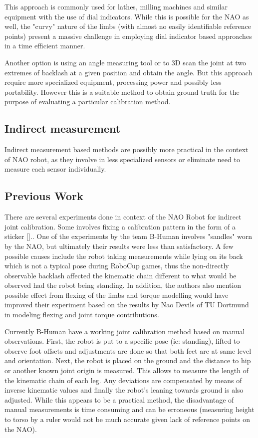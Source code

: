\documentclass[english, printversion, nomenclature, notitle]{tuvisionthesis} %
\begin{document}
This approach is commonly used for lathes, milling machines and similar equipment with the use of dial indicators. While this is possible for the NAO as well, the "curvy" nature of the limbs (with almost no easily identifiable reference points) present a massive challenge in employing dial indicator based approaches in a time efficient manner.

Another option is using an angle measuring tool or to 3D scan the joint at  two extremes of backlash at a given position and obtain the angle. But this approach require more specialized equipment, processing power and possibly less portability. However this is a suitable method to obtain ground truth for the purpose of evaluating a particular calibration method. 

\subsection{Indirect measurement}
Indirect measurement based methods are possibly more practical in the context of NAO robot, as they involve in less specialized sensors or eliminate need to measure each sensor individually.

\subsection{Previous Work}

There are several experiments done in context of the NAO Robot for indirect joint calibration. Some involves fixing a calibration pattern in the form of a sticker [].. One of the experiments by the team B-Human involves "sandles" worn by the NAO, but ultimately their results were less than satisfactory. A few possible causes include the robot taking measurements while lying on its back which is not a typical pose during RoboCup games, thus the non-directly observable backlash affected the kinematic chain different to what would be observed had the robot being standing.  In addition, the authors also mention possible effect from flexing of the limbs and torque modelling would have improved their experiment based on the results by Nao Devils of TU Dortmund in modeling flexing and joint torque contributions. 

Currently B-Human have a working joint calibration method based on manual observations. First, the robot is put to a specific pose (ie: standing), lifted to observe foot offsets and adjustments are done so that both feet are at same level and orientation. Next, the robot is placed on the ground and the distance to hip or another known joint origin is measured. This allows to measure the length of the kinematic chain of each leg. Any deviations are compensated by means of inverse kinematic values and finally the robot's leaning  towards ground is also adjusted. While this appears to be a practical method, the disadvantage of manual measurements is time consuming and can be erroneous (measuring height to torso by a ruler would not be much accurate given lack of reference points on the NAO).
\end{document}
